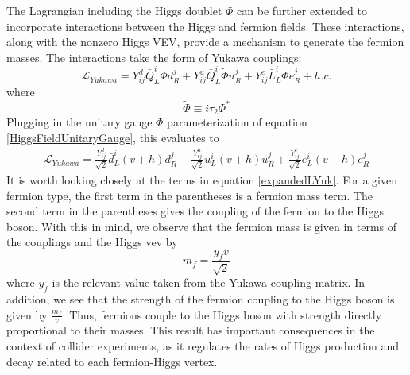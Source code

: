 The Lagrangian including the Higgs doublet $\Phi$ can be further extended to incorporate interactions between the Higgs and fermion fields. These interactions, along with the nonzero Higgs VEV, provide a mechanism to generate the fermion masses. The interactions take the 
form of Yukawa couplings:
\begin{equation}
    \mathcal{L}_{Yukawa} = Y_{ij}^{d}\bar{Q}^{i}_{L}\Phi d_{R}^{j} + Y_{ij}^{u}\bar{Q}^{i}_{L}\tilde{\Phi} u_{R}^{j} 
    + Y_{ij}^{e}\bar{L}^{i}_{L}\Phi e_{R}^{j} + h.c.
    \label{LYukawa}
\end{equation}
where
\begin{equation}
    \tilde{\Phi} \equiv i\tau_{2}\Phi^{*}
    \label{PhiDual}
\end{equation}
Plugging in the unitary gauge $\Phi$ parameterization of equation \ref{HiggsFieldUnitaryGauge}, this evaluates to 
\begin{align}
    \mathcal{L}_{Yukawa} = \frac{Y_{ij}^{d}}{\sqrt{2}}\bar{d}_{L}^{i}(v + h)d_{R}^{j} 
    + \frac{Y_{ij}^{u}}{\sqrt{2}}\bar{u}_{L}^{i}(v+h)u_{R}^{j} + \frac{Y_{ij}^{e}}{\sqrt{2}}\bar{e}_{L}^{i}(v+h)e_{R}^{j}
    \label{expandedLYuk}
\end{align}
It is worth looking closely at the terms in equation \ref{expandedLYuk}. For a given fermion type, the first term in the parentheses
is a fermion mass term. The second term in the parentheses gives the coupling of the fermion to the Higgs boson. With this in mind, 
we observe that the fermion mass is given in terms of the couplings and the Higgs vev by 
\begin{equation}
    m_{f} = \frac{y_{f}v}{\sqrt{2}}
    \label{fermionMass}
\end{equation}
where $y_{f}$ is the relevant value taken from the Yukawa coupling matrix. In addition, we see that the strength of the fermion coupling
to the Higgs boson is given by $\frac{m_{f}}{v}$. Thus, fermions couple to the Higgs boson with strength directly proportional 
to their masses. This result has important consequences in the context of collider experiments, as it regulates the rates of
Higgs production and decay related to each fermion-Higgs vertex. 

